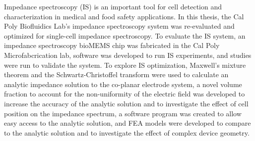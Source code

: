 
\par Impedance spectroscopy (IS) is an important tool for cell detection and characterization in medical and food safety applications. In this thesis, the Cal Poly Biofluidics Lab's impedance spectroscopy system was re-evaluated and optimized for single-cell impedance spectroscopy. To evaluate the IS system, an impedance spectroscopy bioMEMS chip was fabricated in the Cal Poly Microfabcrication lab, software was developed to run IS experiments, and studies were run to validate the system. To explore IS optimization, Maxwell's mixture theorem and the Schwartz-Christoffel transform were used to calculate an analytic impedance solution to the co-planar electrode system, a novel volume fraction to account for the non-uniformity of the electric field was developed to increase the accuracy of the analytic solution and to investigate the effect of cell position on the impedance spectrum, a software program was created to allow easy access to the analytic solution, and FEA models were developed to compare to the analytic solution and to investigate the effect of complex device geometry.



